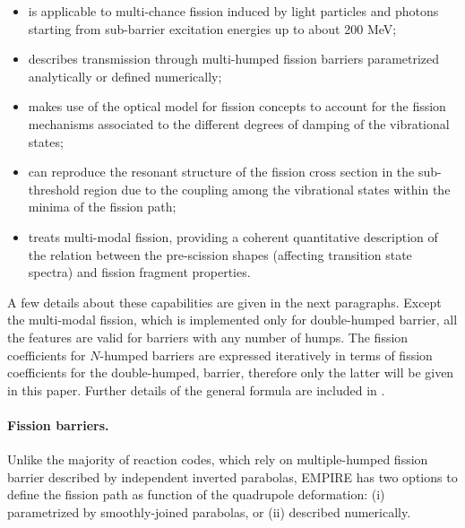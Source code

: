 \begin{itemize}
\item is applicable to multi-chance fission induced by light particles and
photons starting from sub-barrier excitation energies up to about 200 MeV;

\item describes transmission through multi-humped fission barriers
parametrized analytically or defined numerically;

\item makes use of the optical model for fission concepts to account for the
fission mechanisms associated to the different degrees of damping of the
vibrational states;

\item can reproduce the resonant structure of the fission cross section in
the sub-threshold region due to the coupling among the vibrational states
within the minima of the fission path;

\item treats multi-modal fission, providing a coherent quantitative
description of the relation between the pre-scission shapes (affecting
transition state spectra) and fission fragment properties.
\end{itemize}

A few details about these capabilities are given in the next paragraphs.
Except the multi-modal fission, which is implemented only for double-humped
barrier, all the features are valid for barriers with any number of humps.
The fission coefficients for $N$-humped barriers are expressed iteratively
in terms of fission coefficients for the double-humped, barrier, therefore
only the latter will be given in this paper. Further details of the general
formula are included in \cite{Sin:07}. \newline

\medskip %

\paragraph*{Fission barriers.}

Unlike the majority of reaction codes, which rely on multiple-humped fission
barrier described by independent inverted parabolas, EMPIRE has two options
to define the fission path as function of the quadrupole deformation: (i)
parametrized by smoothly-joined parabolas, or (ii) described numerically.

